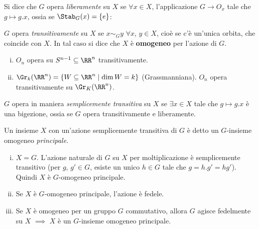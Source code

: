 \documentclass[11pt]{article}
\begin{document}
	\begin{definition}
		Si dice che $G$ opera \textit{liberamente} su $X$ se
		$\forall x \in X$, l'applicazione $G \to O_x$ tale che
		$g \mapsto g.x$, ossia se $\Stab_G(x) = \{e\}$:
	\end{definition}
	
	\begin{definition}
		$G$ opera \textit{transitivamente} su $X$ se $x \sim_G y$ $\forall x$, $y \in X$, cioè se c'è un'unica orbita, che coincide con $X$. In
		tal caso si dice che $X$ è \textbf{omogeneo} per l'azione di $G$.
	\end{definition}

	\begin{example}
		\begin{enumerate}[(i)]
			\item $O_n$ opera su $S^{n-1} \subseteq \RR^n$ transitivamente.
			
			\item $\Gr_k(\RR^n) = \{ W \subseteq \RR^n \mid \dim W = k \}$ (Grassmanniana). $O_n$ opera transitivamente su $\Gr_K(\RR^n)$.
		\end{enumerate}
	\end{example}

	\begin{definition}
		$G$ opera in maniera \textit{semplicemente transitiva} su $X$
		se $\exists x \in X$ tale che $g \mapsto g.x$ è una bigezione,
		ossia se $G$ opera transitivamente e liberamente.
	\end{definition}

	\begin{definition}
		Un insieme $X$ con un'azione semplicemente transitiva di $G$ è
		detto un $G$-insieme omogeneo \textit{principale}.
	\end{definition}

	\begin{example}
		\begin{enumerate}[(i)]
			\item $X = G$. L'azione naturale di $G$ su $X$ per moltiplicazione
			è semplicemente transitivo (per $g$, $g' \in G$, esiste un
			unico $h \in G$ tale che $g = h.g' = hg'$). Quindi $X$
			è $G$-omogeneo principale.
			
			\item Se $X$ è $G$-omogeneo principale, l'azione è fedele.
			
			\item Se $X$ è omogeneo per un gruppo $G$ commutativo, allora
			$G$ agisce fedelmente su $X$ $\implies$ $X$ è un $G$-insieme
			omogeneo principale.
		\end{enumerate}
	\end{example}
\end{document}
